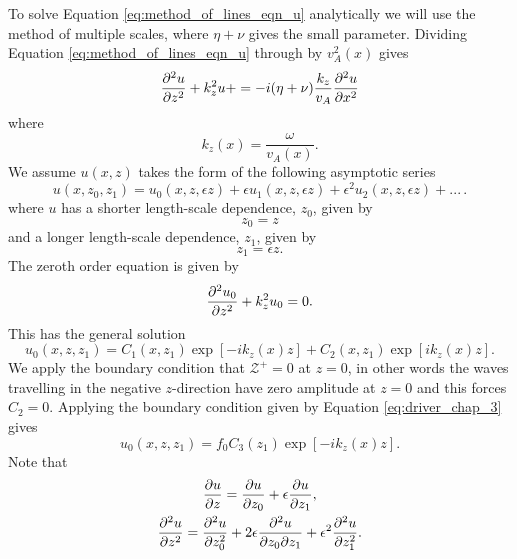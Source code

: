 To solve Equation \eqref{eq:method_of_lines_eqn_u} analytically we will use the method of multiple scales, where $\eta+\nu$ gives the small parameter. Dividing Equation \eqref{eq:method_of_lines_eqn_u} through by $v_A^2(x)$ gives
\begin{equation}
    \pdv[2]{u}{z} + k_z^2 u +  = -i(\eta+\nu)\frac{k_z}{v_A}\pdv[2]{u}{x}
\end{equation}
where
\begin{equation}
    k_z(x) = \frac{\omega}{v_A(x)}.
\end{equation}
We assume $u(x,z)$ takes the form of the following asymptotic series
\begin{equation}
    u(x,z_0,z_1) = u_0(x,z,\epsilon z) + \epsilon u_1(x,z,\epsilon z) + \epsilon^2 u_2(x,z,\epsilon z) + ...\,.
\end{equation}
where $u$ has a shorter length-scale dependence, $z_0$, given by
\begin{equation}
    z_0 = z
\end{equation}
and a longer length-scale dependence, $z_1$, given by
\begin{equation}
    z_1 = \epsilon z.
\end{equation}
The zeroth order equation is given by
\begin{equation}
    \pdv[2]{u_0}{z}+k_z^2u_0=0.
\end{equation}
This has the general solution
\begin{equation}
    u_0(x,z,z_1) = C_1(x,z_1)\exp[-ik_z(x)z] + C_2(x,z_1)\exp[ik_z(x)z].
\end{equation}
We apply the boundary condition that $\mathcal{Z}^{+}=0$ at $z=0$, in other words the waves travelling in the negative $z$-direction have zero amplitude at $z=0$ and this forces $C_2=0$.
Applying the boundary condition given by Equation \eqref{eq:driver_chap_3} gives
\begin{equation}
    \label{eq:u_0_short_timescale}
    u_0(x,z,z_1) = f_0C_3(z_1)\exp[-ik_z(x)z].
\end{equation}
Note that
\begin{gather}
    \pdv{u}{z} = \pdv{u}{z_0} + \epsilon \pdv{u}{z_1}, \\
    \pdv[2]{u}{z} = \pdv[2]{u}{z_0} + 2\epsilon \pdv{u}{z_0}{z_1} + \epsilon^2 \pdv[2]{u}{z_1}.
\end{gather}
